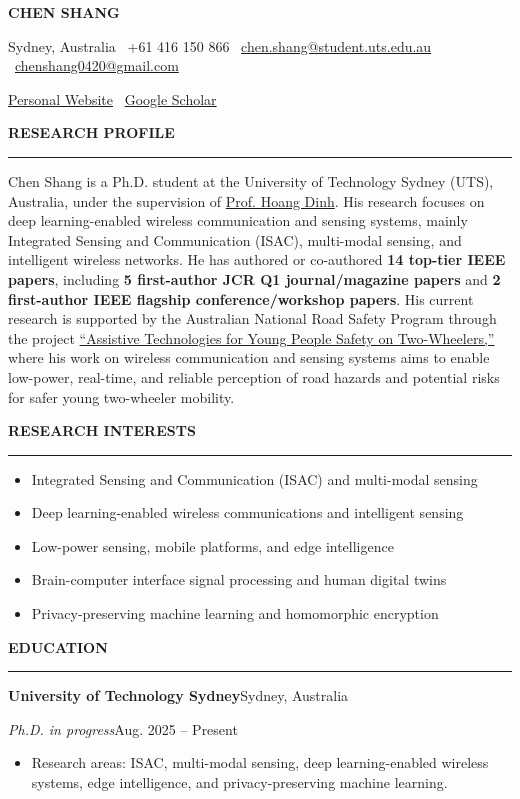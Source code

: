 \documentclass[10pt,a4paper]{article}
\newcommand{\cvname}[1]{
  {\centering\fontsize{20}{22}\selectfont\bfseries #1\par}
}
\newcommand{\cvcontact}[1]{
  {\centering\small #1\par}
}
\newcommand{\sectionrule}[1]{
  \vspace{0.55em}
  {\large\bfseries #1\par}
  \vspace{0.20em}
  \hrule
  \vspace{0.45em}
}
\newcommand{\datedentry}[4]{
  \textbf{#1}\hfill #2\par
  \textit{#3}\hfill #4\par
}
\begin{document}
\cvname{CHEN SHANG}
\cvcontact{Sydney, Australia \textbar\ +61 416 150 866 \textbar\ \href{mailto:chen.shang@student.uts.edu.au}{chen.shang@student.uts.edu.au} \textbar\ \href{mailto:chenshang0420@gmail.com}{chenshang0420@gmail.com}}
\cvcontact{\href{https://chenshang0420.github.io/Chen-Shang.github.io/}{Personal Website} \textbar\ \href{https://scholar.google.com.sg/citations?user=gPX5fZEAAAAJ\&hl=zh-CN}{Google Scholar}}

\sectionrule{RESEARCH PROFILE}
Chen Shang is a Ph.D. student at the University of Technology Sydney (UTS), Australia, under the supervision of \href{https://sites.google.com/view/dinh-thai-hoang/home}{Prof. Hoang Dinh}. His research focuses on deep learning-enabled wireless communication and sensing systems, mainly Integrated Sensing and Communication (ISAC), multi-modal sensing, and intelligent wireless networks. He has authored or co-authored \textbf{14 top-tier IEEE papers}, including \textbf{5 first-author JCR Q1 journal/magazine papers} and \textbf{2 first-author IEEE flagship conference/workshop papers}. His current research is supported by the Australian National Road Safety Program through the project \href{https://researchprofiles.canberra.edu.au/en/projects/assistive-technologies-for-young-people-safety-on-two-wheelers/}{``Assistive Technologies for Young People Safety on Two-Wheelers,''} where his work on wireless communication and sensing systems aims to enable low-power, real-time, and reliable perception of road hazards and potential risks for safer young two-wheeler mobility.

\sectionrule{RESEARCH INTERESTS}
\begin{itemize}
  \item Integrated Sensing and Communication (ISAC) and multi-modal sensing
  \item Deep learning-enabled wireless communications and intelligent sensing
  \item Low-power sensing, mobile platforms, and edge intelligence
  \item Brain-computer interface signal processing and human digital twins
  \item Privacy-preserving machine learning and homomorphic encryption
\end{itemize}

\sectionrule{EDUCATION}
\datedentry{University of Technology Sydney}{Sydney, Australia}{Ph.D. in progress}{Aug. 2025 -- Present}
\begin{itemize}
  \item Research areas: ISAC, multi-modal sensing, deep learning-enabled wireless systems, edge intelligence, and privacy-preserving machine learning.
\end{itemize}
\end{document}
